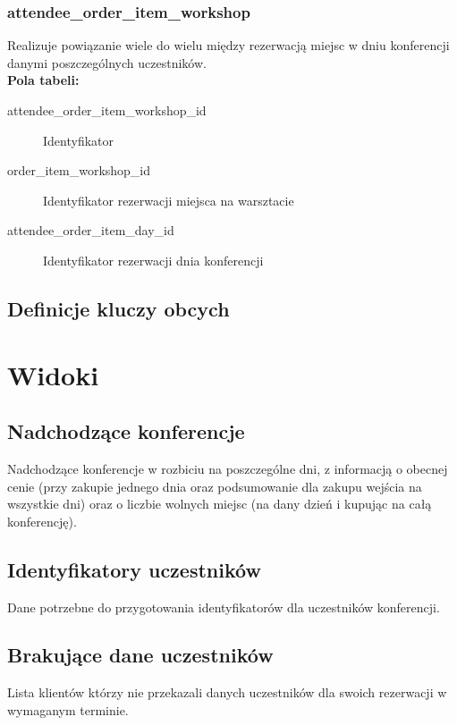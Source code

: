 \documentclass[12pt]{article}
\begin{document}
\subsubsection{attendee\_order\_item\_workshop}
Realizuje powiązanie wiele do wielu między rezerwacją miejsc w dniu konferencji danymi poszczególnych uczestników. \\

\textbf{Pola tabeli:}
\begin{description}
\item [attendee\_order\_item\_workshop\_id] Identyfikator
\item [order\_item\_workshop\_id] Identyfikator rezerwacji miejsca na warsztacie
\item [attendee\_order\_item\_day\_id] Identyfikator rezerwacji dnia konferencji
\end{description}



\subsection{Definicje kluczy obcych}



\section{Widoki}

\subsection{Nadchodzące konferencje}
Nadchodzące konferencje w rozbiciu na poszczególne dni, z informacją o obecnej cenie
(przy zakupie jednego dnia oraz podsumowanie dla zakupu wejścia na wszystkie dni) oraz o liczbie wolnych miejsc (na dany dzień i kupując na całą konferencję).


\subsection{Identyfikatory uczestników}
Dane potrzebne do przygotowania identyfikatorów dla uczestników konferencji.


\subsection{Brakujące dane uczestników}
Lista klientów którzy nie przekazali danych uczestników dla swoich rezerwacji w wymaganym terminie.

\end{document}
